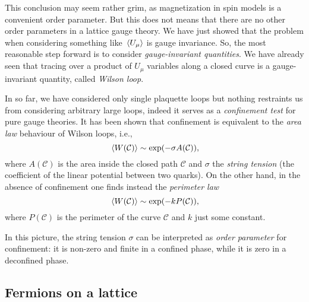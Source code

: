 This conclusion may seem rather grim, as magnetization in spin models is a convenient order parameter.
But this does not means that there are no other order parameters in a lattice gauge theory.
We have just showed that the problem when considering something like $\ev*{U_{\mu}}$ is gauge invariance.
So, the most reasonable step forward is to consider \emph{gauge-invariant quantities}.
We have already seen that tracing over a product of $U_{\mu}$ variables along a closed curve is a gauge-invariant quantity, called \emph{Wilson loop}.

In so far, we have considered only single plaquette loops but nothing restraints us from considering arbitrary large loops, indeed it serves as a \emph{confinement test} for pure gauge theories.
It has been shown \citneeded that confinement is equivalent to the \emph{area law} behaviour of Wilson loops, i.e.,
\begin{equation}
    \ev*{W(\mathcal{C})} \sim \exp(- \sigma A(\mathcal{C})),
\end{equation}
where $A(\mathcal{C})$ is the area inside the closed path $\mathcal{C}$ and $\sigma$ the \emph{string tension} (the coefficient of the linear potential between two quarks).
On the other hand, in the absence of confinement one finds instead the \emph{perimeter law}
\begin{equation}
    \ev*{W(\mathcal{C})} \sim \exp(- k P(\mathcal{C})),
\end{equation}
where $P(\mathcal{C})$ is the perimeter of the curve $\mathcal{C}$ and $k$ just some constant.


In this picture, the string tension $\sigma$ can be interpreted as \emph{order parameter} for confinement:
it is non-zero and finite in a confined phase, while it is zero in a deconfined phase.



\subsection{Fermions on a lattice}
\label{sub:fermions_on_a_lattice}
